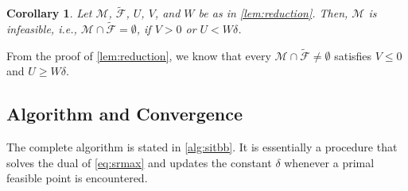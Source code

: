 \documentclass[a4paper,10pt,journal]{IEEEtran}
\newtheorem{corollary}{Corollary}
\begin{document}
\begin{corollary} \label{corr:feas}
	Let $\mathcal M$, $\tilde{\mathcal F}$, $U$, $V$, and $W$ be as in \cref{lem:reduction}. Then, $\mathcal M$ is infeasible, i.e., $\mathcal M \cap \tilde{\mathcal F} = \emptyset$, if $V > 0$ or $U < W \delta$.
\end{corollary}
\begin{IEEEproof}
From the proof of \cref{lem:reduction}, we know that every $\mathcal M \cap \tilde{\mathcal F} \neq \emptyset$ satisfies $V \le 0$ and $U \ge W \delta$.
\end{IEEEproof}

\subsection{Algorithm and Convergence}
The complete algorithm is stated in \cref{alg:sitbb}. It is essentially a  procedure \cite{Tuy2016,diss} that solves the  dual of \cref{eq:srmax} and updates the constant $\delta$ whenever a primal feasible point is encountered.
\end{document}
